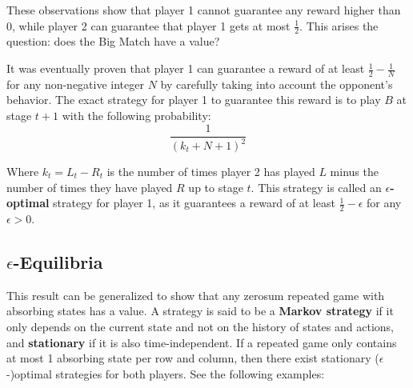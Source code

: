 \documentclass[12pt]{article}
\begin{document}
\noindent
These observations show that player 1 cannot guarantee any reward higher than 0, while player 2 can guarantee that player 1 gets at most $\frac{1}{2}$.
This arises the question: does the Big Match have a value?

\newpage
\noindent
It was eventually proven that player 1 can guarantee a reward of at least $\frac{1}{2} - \frac{1}{N}$ for any non-negative integer $N$ by carefully taking into account the opponent's behavior.
The exact strategy for player 1 to guarantee this reward is to play $B$ at stage $t + 1$ with the following probability:
\[ \frac{1}{(k_t + N + 1)^2} \]

\noindent
Where $k_t = L_t - R_t$ is the number of times player 2 has played $L$ minus the number of times they have played $R$ up to stage $t$. 
This strategy is called an \textbf{$\epsilon$-optimal} strategy for player 1, as it guarantees a reward of at least $\frac{1}{2} - \epsilon$ for any $\epsilon > 0$.

\subsection{\texorpdfstring{$\epsilon$}{epsilon}-Equilibria}
This result can be generalized to show that any zerosum repeated game with absorbing states has a value.
A strategy is said to be a \textbf{Markov strategy} if it only depends on the current state and not on the history of states and actions, and \textbf{stationary} if it is also time-independent.
If a repeated game only contains at most 1 absorbing state per row and column, then there exist stationary ($\epsilon$-)optimal strategies for both players.
See the following examples:
\vspace{-0.5cm}
\end{document}
